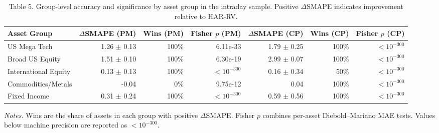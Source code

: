 \begin{table}[H]
\centering
\scriptsize
\setlength{\tabcolsep}{3pt}
\caption*{Table 5. Group-level accuracy and significance by asset group in the intraday sample. Positive $\Delta$SMAPE indicates improvement relative to HAR-RV.}
\begin{tabular}{lrrrrrr}
\toprule
Asset Group & $\Delta$SMAPE (PM) & Wins (PM) & Fisher $p$ (PM) & $\Delta$SMAPE (CP) & Wins (CP) & Fisher $p$ (CP) \\
\midrule
US Mega Tech & 1.26 $\pm$ 0.13 & 100\% & 6.11e-33 & 1.79 $\pm$ 0.25 & 100\% & $<10^{-300}$ \\
Broad US Equity & 1.51 $\pm$ 0.10 & 100\% & 6.30e-19 & 2.99 $\pm$ 0.07 & 100\% & $<10^{-300}$ \\
International Equity & 0.13 $\pm$ 0.13 & 100\% & $<10^{-300}$ & 0.16 $\pm$ 0.34 & 50\% & $<10^{-300}$ \\
Commodities/Metals & -0.04 & 0\% & 9.75e-12 & 0.04 & 100\% & $<10^{-300}$ \\
Fixed Income & 0.31 $\pm$ 0.24 & 100\% & $<10^{-300}$ & 0.59 $\pm$ 0.56 & 100\% & $<10^{-300}$ \\
\bottomrule
\end{tabular}
\vspace{2pt}
\scriptsize{\emph{Notes.} Wins are the share of assets in each group with positive $\Delta$SMAPE. Fisher $p$ combines per-asset Diebold--Mariano MAE tests. Values below machine precision are reported as $<10^{-300}$.}
\end{table}
